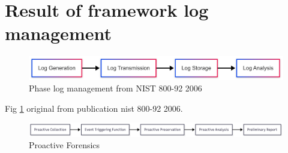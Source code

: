 






\section{Result of framework log management}


\begin{figure}[H] 
	\centering
	\includegraphics[width=14cm]{figure/log-management-nist-800-92-original.png}
	\caption{ Phase log management from NIST 800-92 2006 \citet{kentnist800922006guide}}
	\label{fig:nist-log-management}
\end{figure}

Fig \ref{fig:nist-log-management} original from publication nist 800-92 2006.
\begin{figure}[H] 
	\centering
	\includegraphics[width=14cm]{figure/proactive-collection.png}
	\caption{ Proactive Forensics \citet{proactiveandreactivedigitalforensics}}
	\label{fig:proactive-forensic}
\end{figure}


